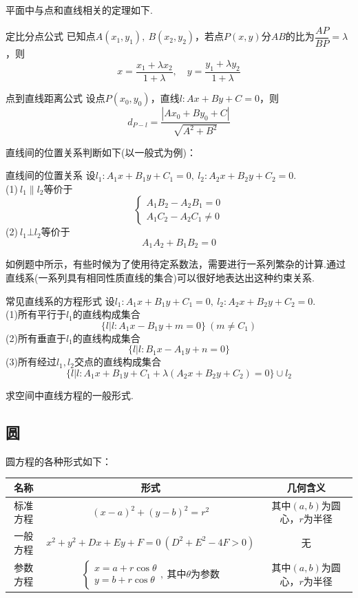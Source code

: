 \documentclass[lang=cn, zihao=5]{elegantbook}
\begin{document}
平面中与点和直线相关的定理如下.

\begin{theorem}{定比分点公式}
	已知点$A(x_1,y_1),~B(x_2,y_2)$，若点$P(x,y)$分$AB$的比为$\dfrac{AP}{BP}=\lambda$，则$$x=\frac{x_1+\lambda x_2}{1+\lambda}, \quad y = \frac{y_1+\lambda y_2}{1+\lambda}$$
\end{theorem}

\begin{theorem}{点到直线距离公式}
	设点$P(x_0,y_0)$，直线$l:Ax+By+C=0$，则$$d_{P-l}=\frac{|Ax_0+By_0+C|}{\sqrt{A^2+B^2}}$$
\end{theorem}

直线间的位置关系判断如下(以一般式为例)：

\begin{proposition}{直线间的位置关系}
	设$l_1:A_1x+B_1y+C_1=0,~l_2:A_2x+B_2y+C_2=0$. \\
	(1)$~l_1 \parallel l_2$等价于$$\begin{cases}
		A_1B_2-A_2B_1=0 \\
		A_1C_2-A_2C_1 \neq 0
	\end{cases}$$
	(2)$~l_1 \bot l_2$等价于$$A_1A_2+B_1B_2=0$$
\end{proposition}

如例题中所示，有些时候为了使用待定系数法，需要进行一系列繁杂的计算.通过直线系(一系列具有相同性质直线的集合)可以很好地表达出这种约束关系.

\begin{proposition}{常见直线系的方程形式}
	设$l_1:A_1x+B_1y+C_1=0,~l_2:A_2x+B_2y+C_2=0$. \\
	(1)所有平行于$l_1$的直线构成集合$$\{ l|l:A_1x-B_1y+m=0 \}~(m \neq C_1)$$
	(2)所有垂直于$l_1$的直线构成集合$$\{ l|l:B_1x-A_1y+n=0 \}$$
	(3)所有经过$l_1,l_2$交点的直线构成集合$$\{ l|l:A_1x+B_1y+C_1+\lambda (A_2x+B_2y+C_2)=0 \} \cup l_2$$
\end{proposition}

\begin{problem}
	求空间中直线方程的一般形式.
\end{problem}

\subsection{圆}

圆方程的各种形式如下：

\begin{table}[h]
	\centering
	\renewcommand\arraystretch{1.5}
	\begin{tabular}{ccc}
		\toprule
		名称&形式&几何含义 \\
		\midrule
		标准方程 & $(x-a)^2+(y-b)^2=r^2$ & 其中$(a,b)$为圆心，$r$为半径 \\
		一般方程 & $x^2+y^2+Dx+Ey+F=0~(D^2+E^2-4F>0)$ & 无 \\
		参数方程 & $\begin{cases}
			x=a+r\cos \theta \\
			y=b+r\cos \theta
		\end{cases}, ~\textit{其中}\theta \textit{为参数}$ & 其中$(a,b)$为圆心，$r$为半径 \\
		\bottomrule
	\end{tabular}
\end{table}
\end{document}
